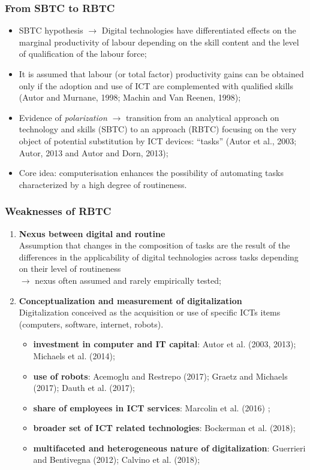 \documentclass[10pt,xcolor={usenames,dvipsnames}]{beamer}
\begin{document}
\begin{frame} 
\frametitle{From SBTC to RBTC}
\begin{itemize}
\item SBTC hypothesis $\rightarrow$ Digital technologies have differentiated effects on the marginal productivity of labour depending on the skill content and the level of qualification of the labour force;
\smallskip
\item It is assumed that labour (or total factor) productivity gains can be obtained only if the adoption and use of ICT are complemented with qualified skills  (Autor and Murnane, 1998;  Machin and Van Reenen, 1998);
\medskip
\item Evidence of \textit{polarization} $\rightarrow$ transition from an analytical approach on technology and skills (SBTC) to an approach (RBTC) focusing on the very object of potential substitution by ICT devices: “tasks” (Autor et al., 2003; Autor, 2013 and Autor and Dorn, 2013);
\smallskip
\item Core idea: computerisation enhances the possibility of automating tasks characterized by a high degree of routineness.
\end{itemize}
\end{frame}


\begin{frame} 
\frametitle{Weaknesses of RBTC}
\begin{enumerate}
\item \textbf{Nexus between digital and routine} \\
\small
Assumption that changes in the composition of tasks are the result of the differences in the  applicability of digital technologies across tasks depending on their level of routineness\\
$\rightarrow$ nexus often assumed and rarely empirically tested;
\medskip
\item \textbf{Conceptualization and measurement of digitalization} \\
\small
Digitalization conceived as the acquisition or use of specific ICTs items (computers, software, internet, robots). 
\begin{itemize}
    \item \textbf{investment in computer and IT capital}: Autor et al. (2003, 2013); Michaels et al. (2014);
    \item \textbf{use of robots}: Acemoglu and Restrepo (2017); Graetz and Michaels (2017); Dauth et al. (2017);
    \item \textbf{share of employees in ICT services}: Marcolin et al. (2016) ;
    \item \textbf{broader set of ICT related technologies}: Bockerman et al. (2018);
    \item \textbf{multifaceted and heterogeneous nature of digitalization}: Guerrieri and Bentivegna (2012); Calvino et al. (2018);
\end{itemize}
\end{enumerate}
\end{frame}
\end{document}
